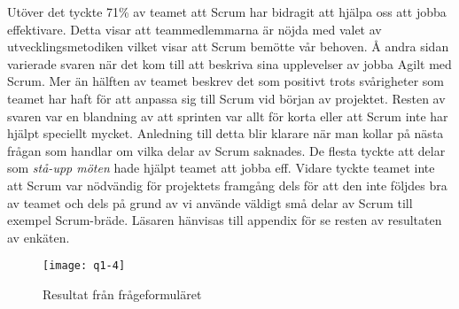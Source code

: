Utöver det tyckte 71\% av teamet att Scrum har bidragit att hjälpa oss att jobba effektivare. Detta visar att teammedlemmarna är nöjda med valet av utvecklingsmetodiken vilket visar att Scrum bemötte vår behoven. Å andra sidan varierade svaren när det kom till att beskriva sina upplevelser av jobba Agilt med Scrum. Mer än hälften av teamet beskrev det som positivt trots svårigheter som teamet har haft för att anpassa sig till Scrum vid början av projektet. Resten av svaren var en blandning av att sprinten var allt för korta eller att Scrum inte har hjälpt speciellt mycket. Anledning till detta blir klarare när man kollar på nästa frågan som handlar om vilka delar av Scrum saknades. De flesta tyckte att delar som \textit{stå-upp möten} hade  hjälpt teamet att jobba eff. Vidare tyckte teamet inte att Scrum var nödvändig för projektets framgång dels för att den inte följdes bra av teamet och dels på grund av vi använde väldigt små delar av Scrum till exempel Scrum-bräde.
Läsaren hänvisas till appendix \cite{Leypendix} för se resten av resultaten av enkäten.
\begin{figure*}[h]
	\centering
	\texttt{[image: q1-4]}
	\caption{Resultat från frågeformuläret}
	\label{q1}
\end{figure*}